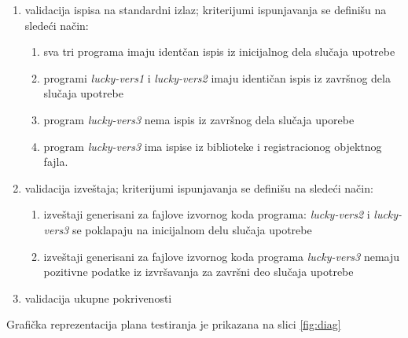 \documentclass[12pt,oneside]{memoir}
\newcommand{\strano}[1]{\textit{#1}}
\begin{document}
\begin{enumerate}
\begin{enumerate}
\item validacija ispisa na standardni izlaz; kriterijumi ispunjavanja se definišu na sledeći način:
\begin{enumerate}
\item sva tri programa imaju identčan ispis iz inicijalnog dela slučaja upotrebe
\item programi \strano{lucky-vers1} i  \strano{lucky-vers2} imaju identičan ispis iz završnog dela slučaja upotrebe
\item program \strano{lucky-vers3} nema ispis iz završnog dela slučaja uporebe
\item program \strano{lucky-vers3} ima ispise iz biblioteke i registracionog objektnog fajla.
\end{enumerate}
\item validacija izveštaja; kriterijumi ispunjavanja se definišu na sledeći način: 
\begin{enumerate}
\item izveštaji generisani za fajlove izvornog koda programa: \strano{lucky-vers2} i \strano{lucky-vers3} se poklapaju na inicijalnom delu slučaja upotrebe
\item izveštaji generisani za fajlove izvornog koda programa \strano{lucky-vers3} nemaju pozitivne podatke iz izvršavanja za završni deo slučaja upotrebe
\end{enumerate}
\item validacija ukupne pokrivenosti
\end{enumerate}
\end{enumerate}

Grafička reprezentacija plana testiranja je prikazana na slici \ref{fig:diag}
\end{document}
